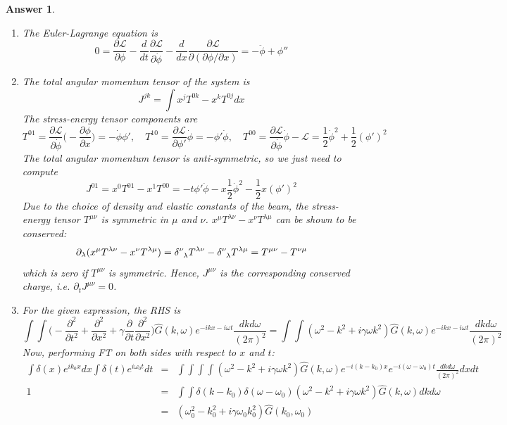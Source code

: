 \documentclass[a4paper]{article}
\newtheorem{ans}{Answer}[section]
\theoremstyle{new}
\begin{document}
\begin{ans}\leavevmode
\begin{enumerate}[label=(\alph*)]
\item The Euler-Lagrange equation is
$$0=\frac{\partial\mathcal{L}}{\partial\phi}-\frac{d}{dt}\frac{\partial\mathcal{L}}{\partial\dot{\phi}}-\frac{d}{dx}\frac{\partial\mathcal{L}}{\partial(\partial\phi/\partial x)}=-\ddot{\phi}+\phi''$$
\item The total angular momentum tensor of the system is
$$J^{jk}=\int x^jT^{0k}-x^kT^{0j}dx$$
The stress-energy tensor components are
$$T^{01}=\frac{\partial\mathcal{L}}{\partial\dot{\phi}}\bigg(-\frac{\partial\phi}{\partial x}\bigg)=-\dot{\phi}\phi',\quad T^{10}=\frac{\partial\mathcal{L}}{\partial\phi'}\dot{\phi}=-\phi'\dot{\phi},\quad T^{00}=\frac{\partial\mathcal{L}}{\partial\dot{\phi}}\dot{\phi}-\mathcal{L}=\frac{1}{2}\dot{\phi}^2+\frac{1}{2}(\phi')^2$$
The total angular momentum tensor is anti-symmetric, so we just need to compute
$$J^{01}=x^0T^{01}-x^1T^{00}=-t\phi'\dot{\phi}-x\frac{1}{2}\dot{\phi}^2-\frac{1}{2}x(\phi')^2$$
Due to the choice of density and elastic constants of the beam, the stress-energy tensor $T^{\mu\nu}$ is symmetric in $\mu$ and $\nu$. $x^\mu T^{\lambda\nu}-x^\nu T^{\lambda\mu}$ can be shown to be conserved:
$$\partial_\lambda(x^\mu T^{\lambda\nu}-x^\nu T^{\lambda\mu})=\tensor*{\delta}{*_{}^{\nu}_{\lambda}}T^{\lambda\nu}-\tensor*{\delta}{*_{}^{\nu}_{\lambda}}T^{\lambda\mu}=T^{\mu\nu}-T^{\nu\mu}$$
which is zero if $T^{\mu\nu}$ is symmetric. Hence, $J^{\mu\nu}$ is the corresponding conserved charge, i.e. $\partial_tJ^{\mu\nu}=0$.
\item For the given expression, the RHS is
$$\int\int\bigg(-\frac{\partial^2}{\partial t^2}+\frac{\partial^2}{\partial x^2}+\gamma\frac{\partial}{\partial t}\frac{\partial^2}{\partial x^2}\bigg)\hat{G}(k,\omega)e^{-ikx-i\omega t}\frac{dkd\omega}{(2\pi)^2}=\int\int(\omega^2-k^2+i\gamma\omega k^2)\hat{G}(k,\omega)e^{-ikx-i\omega t}\frac{dkd\omega}{(2\pi)^2}$$
Now, performing FT on both sides with respect to $x$ and $t$:
\begin{eqnarray}
\int\delta(x)e^{ik_0x}dx\int\delta(t)e^{i\omega_0t}dt&=&\int\int\int\int(\omega^2-k^2+i\gamma\omega k^2)\hat{G}(k,\omega)e^{-i(k-k_0)x}e^{-i(\omega-\omega_0)t}\frac{dkd\omega}{(2\pi)^2}dxdt\nonumber\\
1&=&\int\int\delta(k-k_0)\delta(\omega-\omega_0)(\omega^2-k^2+i\gamma\omega k^2)\hat{G}(k,\omega)dkd\omega\nonumber\\&=&
(\omega_0^2-k_0^2+i\gamma\omega_0k_0^2)\hat{G}(k_0,\omega_0)\nonumber

\end{eqnarray}
\end{enumerate}
\end{ans}
\end{document}
